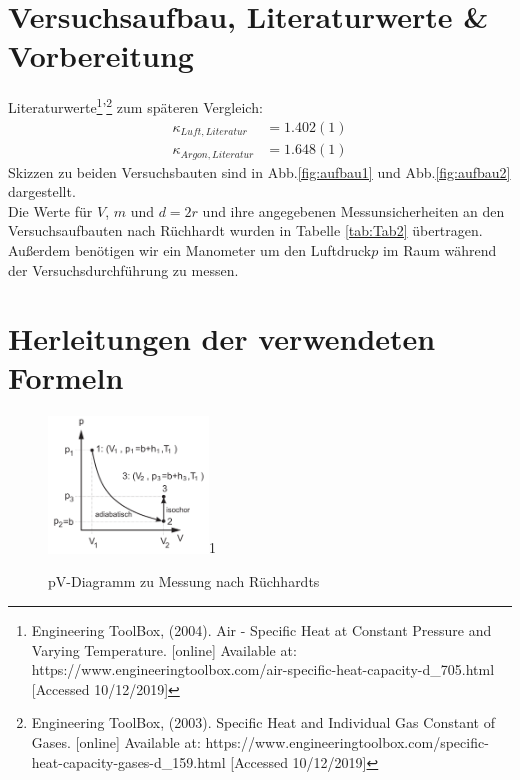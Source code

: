 \documentclass[a4paper,10pt]{article}
\begin{document}
\section{Versuchsaufbau, Literaturwerte \& Vorbereitung}
Literaturwerte\footnote{ Engineering ToolBox, (2004). Air - Specific Heat at Constant Pressure and Varying Temperature. [online] Available at: https://www.engineeringtoolbox.com/air-specific-heat-capacity-d\_705.html [Accessed 10/12/2019]}'\footnote{ Engineering ToolBox, (2003). Specific Heat and Individual Gas Constant of Gases. [online] Available at: https://www.engineeringtoolbox.com/specific-heat-capacity-gases-d\_159.html [Accessed 10/12/2019]} zum späteren Vergleich:
\begin{align*}
\kappa_{Luft,Literatur}&=1.402(1)\\
\kappa_{Argon,Literatur}&=1.648(1)
\end{align*}
Skizzen zu beiden Versuchsbauten sind in Abb.\ref{fig:aufbau1} und Abb.\ref{fig:aufbau2} dargestellt.\\
Die Werte für \(V\), \(m\) und \(d=2r\) und ihre angegebenen Messunsicherheiten an den Versuchsaufbauten nach Rüchhardt wurden in Tabelle \ref{tab:Tab2} übertragen. Außerdem benötigen wir ein Manometer um den Luftdruck\(p\)  im Raum während der Versuchsdurchführung zu messen.

\section[Herleitungen der verwendeten Formeln]{Herleitungen der verwendeten Formeln\fnrefb}
\begin{figure}
  \centering
  \caption{pV-Diagramm zu Messung nach Rüchhardts}
  \begin{annotate}{\includegraphics[width=0.38\textwidth]{pv.png}}{1}
  \end{annotate}

\label{fig:pv}
\end{figure} 
\end{document}
